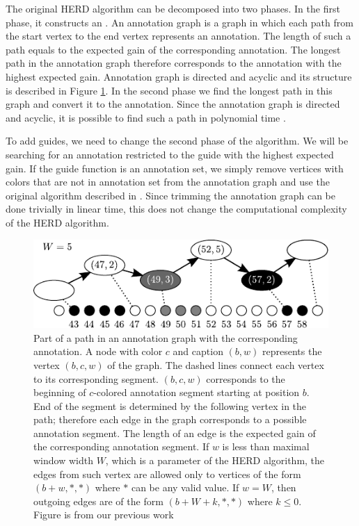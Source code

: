 The original HERD algorithm can be decomposed into two phases. In the first
phase, it constructs an .  An annotation graph is
a graph in which each path from the start vertex to the end vertex represents
an annotation. The length of such a path equals to the expected gain of the
corresponding annotation. The longest path in the annotation graph therefore
corresponds to the annotation with the highest expected gain. Annotation graph
is directed and acyclic and its structure is described in Figure
\ref{HERD:figure:annotation_graph}. In the second phase we find the longest
path in this graph and convert it to the annotation. Since the annotation graph
is directed and acyclic, it is possible to find such a path in polynomial time
\cite{Nanasi2010mgr}.

To add guides, we need to change the second phase of the algorithm. We will be
searching for an annotation restricted to the guide with the highest expected
gain. If the guide function is an annotation set,  we simply remove vertices with
colors that are not in annotation set from the annotation graph and use the original
algorithm described in \cite{Nanasi2010mgr}. Since trimming the annotation graph
can be done trivially in linear time, this does not change the computational
complexity of the HERD algorithm.

\begin{figure}
\begin{center}
\includegraphics{../figures/herd_graph}
\end{center} 
\caption[Annotation graph]{Part of a path in an annotation graph with the
corresponding annotation. A node with color $c$ and caption $(b,w)$ represents
the vertex $(b,c,w)$ of the graph. The dashed lines connect each vertex to its
corresponding segment. $(b, c, w)$ corresponds to the beginning of $c$-colored
annotation segment starting at position $b$. End of the segment is determined
by the following vertex in the path; therefore each edge in the graph
corresponds to a possible annotation segment. The length of an edge is the
expected gain of the corresponding annotation segment. If $w$ is less than
maximal window width $W$, which is a parameter of the HERD algorithm, the edges
from such vertex are allowed only to vertices of the form $(b+w, *, *)$ where
$*$ can be any valid value. If $w=W$, then outgoing edges are of the form
$(b+W+k, *, *)$ where $k\leq0$.  Figure is from our previous work
\cite{Nanasi2010mgr}}\label{HERD:figure:annotation_graph} 
\end{figure}

